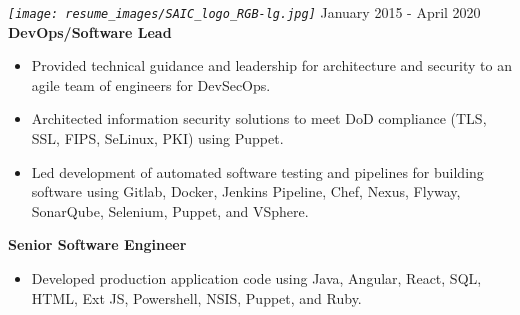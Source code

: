 \documentclass[12pt, line, margin]{res}
\begin{document}
\begin{resume}
            {\sl
              \texttt{[image: resume\_images/SAIC\_logo\_RGB-lg.jpg]}
            }
            \hfill January 2015 - April 2020 \\
            \textbf{DevOps/Software Lead}
            \begin{itemize}  [nolistsep, noitemsep, topsep=0px, parsep=0px, partopsep=0px] %
              \item   Provided technical guidance and leadership for architecture \newline
                          and security to an agile team of engineers for DevSecOps.
              \item   Architected information security solutions to meet DoD \newline
                          compliance (TLS, SSL, FIPS, SeLinux, PKI) using Puppet.
              \item   Led development of automated software testing and pipelines \newline
                          for building software using Gitlab, Docker, Jenkins Pipeline, Chef,
                          Nexus, Flyway, SonarQube, Selenium, Puppet, and VSphere.
            \end{itemize}
            \vspace{-5mm} %
            \textbf{Senior Software Engineer}
            \begin{itemize}  [nolistsep, noitemsep, topsep=0px, parsep=0px, partopsep=0px] %
              \item   Developed production application code using Java, Angular, \newline 
                          React, SQL, HTML, Ext JS, Powershell, NSIS, Puppet, and Ruby.

\end{itemize}
\end{resume}
\end{document}
